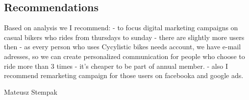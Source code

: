 \documentclass[
]{article}
\begin{document}
\hypertarget{recommendations}{%
\subsection{Recommendations}\label{recommendations}}

Based on analysis we I recommend: - to focus digital marketing campaigns
on casual bikers who rides from thursdays to sunday - there are slightly
more users then - as every person who uses Cycylistic bikes needs
account, we have e-mail adresses, so we can create personalized
communication for people who choose to ride more than 3 times - it's
cheaper to be part of annual member. - also I recommend remarketing
campaign for those users on facebooka and google ads.

Mateusz Stempak
\end{document}
